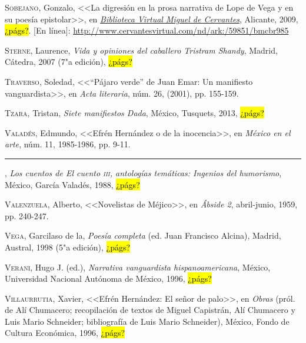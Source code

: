 \documentclass[14pt,twoside,final]{extbook} %
\begin{document}
\textsc{Sobejano}, Gonzalo, <<La digresión en la prosa narrativa de Lope de Vega y en su poesía epistolar>>, en \href{http://www.cervantesvirtual.com/}{\emph{Biblioteca Virtual Miguel de Cervantes}}, Alicante, 2009, \hl{¿págs?}. [En línea]: \url{http://www.cervantesvirtual.com/nd/ark:/59851/bmcbr985}\label{bib:sobejano2009}

\textsc{Sterne}, Laurence, \emph{Vida y opiniones del caballero Tristram Shandy}, Madrid, Cátedra, 2007 (7"a edición), \hl{¿págs?}\label{bib:sterne2007}

\textsc{Traverso}, Soledad, <<``Pájaro verde'' de Juan Emar: Un manifiesto vanguardista>>, en \emph{Acta literaria}, núm. 26, (2001), pp. 155-159.\label{bib:traverso2001}

\textsc{Tzara}, Tristan, \emph{Siete manifiestos Dada}, México, Tusquets, 2013, \hl{¿págs?}\label{bib:tzara2013}

\textsc{Valadés}, Edmundo, <<Efrén Hernández o de la inocencia>>, en \emph{México en el arte}, núm. 11, 1985-1986, pp. 9-11.\label{bib:valades1985}

\rule{1cm}{0.4pt}, \emph{Los cuentos de \emph{El cuento} \textsc{iii}, antologías temáticas: Ingenios del humorismo}, México, García Valadés, 1988, \hl{¿págs?}\label{bib:valades1988}

\textsc{Valenzuela}, Alberto, <<Novelistas de Méjico>>, en \emph{Ábside 2}, abril-junio, 1959, pp. 240-247.\label{bib:valenzuela1959}

\textsc{Vega}, Garcilaso de la, \emph{Poesía completa} (ed. Juan Francisco Alcina), Madrid, Austral, 1998 (5"a edición), \hl{¿págs?}\label{bib:vega1998}

\textsc{Verani}, Hugo J. (ed.), \emph{Narrativa vanguardista hispanoamericana}, México, Universidad Nacional Autónoma de México, 1996, \hl{¿págs?}\label{bib:verani1996}

\textsc{Villaurrutia}, Xavier, <<Efrén Hernández: El señor de palo>>, en \emph{Obras} (pról. de Alí Chumacero; recopilación de textos de Miguel Capistrán, Alí Chumacero y Luis Mario Schneider; bibliografía de Luis Mario Schneider), México, Fondo de Cultura Económica, 1996, \hl{¿págs?}\label{bib:villaurrutia1996}
\end{document}
